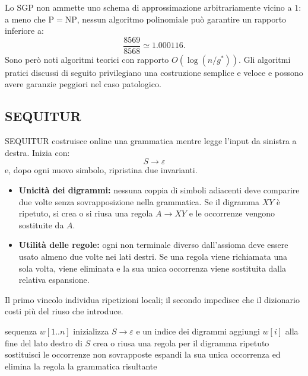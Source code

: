 \documentclass{article}
\theoremstyle{definition}
\numberwithin{equation}{section}
\begin{document}
Lo SGP non ammette uno schema di approssimazione arbitrariamente vicino a $1$:
a meno che $\mathrm{P}=\mathrm{NP}$, nessun algoritmo polinomiale può garantire
un rapporto inferiore a:
\[
    \frac{8569}{8568}\simeq 1.000116.
\]
Sono però noti algoritmi teorici con rapporto
$O(\log(n/g^*))$. Gli algoritmi pratici discussi di seguito privilegiano una
costruzione semplice e veloce e possono avere garanzie peggiori nel caso
patologico.

\subsection{SEQUITUR}
SEQUITUR costruisce online una grammatica mentre legge l'input da sinistra a
destra. Inizia con:
\[
    S\to\varepsilon
\]
e, dopo ogni nuovo simbolo, ripristina due invarianti.

\begin{itemize}
    \item \textbf{Unicità dei digrammi:} nessuna coppia di simboli adiacenti
          deve comparire due volte senza sovrapposizione nella grammatica. Se
          il digramma $XY$ è ripetuto, si crea o si riusa una regola
          $A\to XY$ e le occorrenze vengono sostituite da $A$.
    \item \textbf{Utilità delle regole:} ogni non terminale diverso
          dall'assioma deve essere usato almeno due volte nei lati destri. Se
          una regola viene richiamata una sola volta, viene eliminata e la sua
          unica occorrenza viene sostituita dalla relativa espansione.
\end{itemize}

Il primo vincolo individua ripetizioni locali; il secondo impedisce che il
dizionario costi più del riuso che introduce.

\begin{algorithm}[H]
    \caption{Schema di SEQUITUR}
    \begin{algorithmic}[1]
        \Require sequenza $w[1..n]$
        \State inizializza $S\to\varepsilon$ e un indice dei digrammi
        \State aggiungi $w[i]$ alla fine del lato destro di $S$
        \State crea o riusa una regola per il digramma ripetuto
        \State sostituisci le occorrenze non sovrapposte
        \EndWhile
        \State espandi la sua unica occorrenza ed elimina la regola
        \EndWhile
        \EndFor
        \State \Return la grammatica risultante
    \end{algorithmic}
    \label{alg:sequitur}
\end{algorithm}
\end{document}
